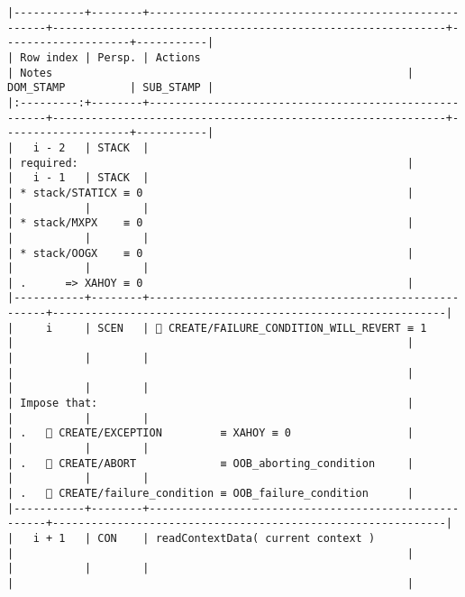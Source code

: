 \documentclass[varwidth=\maxdimen,margin=0.5cm,multi={verbatim}]{standalone}
\begin{document}
\begin{verbatim}
|-----------+--------+------------------------------------------------------+-------------------------------------------------------------+--------------------+-----------|
| Row index | Persp. | Actions                                              | Notes                                                       | DOM_STAMP          | SUB_STAMP |
|:---------:+--------+------------------------------------------------------+-------------------------------------------------------------+--------------------+-----------|
|   i - 2   | STACK  |                                                      | required:                                                   |
|   i - 1   | STACK  |                                                      | * stack/STATICX ≡ 0                                         |
|           |        |                                                      | * stack/MXPX    ≡ 0                                         |
|           |        |                                                      | * stack/OOGX    ≡ 0                                         |
|           |        |                                                      | .      => XAHOY ≡ 0                                         |
|-----------+--------+------------------------------------------------------+-------------------------------------------------------------|
|     i     | SCEN   |  CREATE/FAILURE_CONDITION_WILL_REVERT ≡ 1           |                                                             |
|           |        |                                                      |                                                             |
|           |        |                                                      | Impose that:                                                |
|           |        |                                                      | .    CREATE/EXCEPTION         ≡ XAHOY ≡ 0                  |
|           |        |                                                      | .    CREATE/ABORT             ≡ OOB_aborting_condition     |
|           |        |                                                      | .    CREATE/failure_condition ≡ OOB_failure_condition      |
|-----------+--------+------------------------------------------------------+-------------------------------------------------------------|
|   i + 1   | CON    | readContextData( current context )                   |                                                             |
|           |        |                                                      |                                                             |

\end{verbatim}
\end{document}

